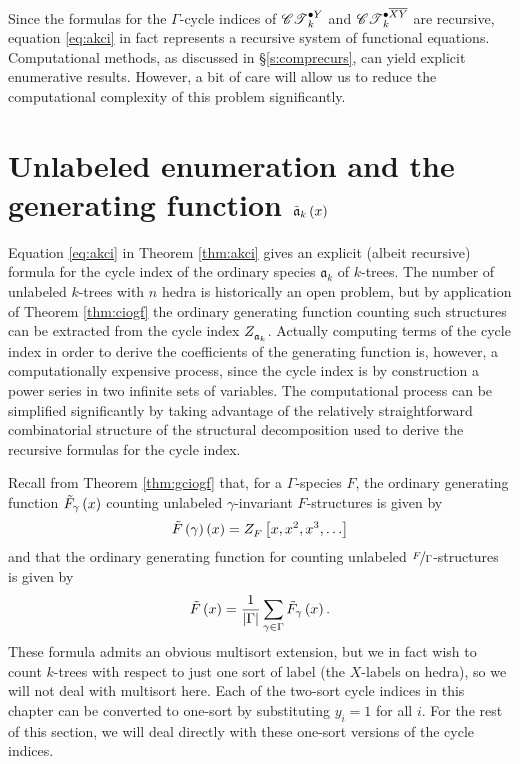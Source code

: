 \documentclass[sectionflow,singlespace,twoside,boldmathhdr,draft]{brandiss} %
\numberwithin{section}{chapter}
\numberwithin{figure}{chapter}
\begin{document}
Since the formulas for the $\Gamma$-cycle indices of $\pointed[Y]{\specname{CT}}_{k}$ and $\pointed[\overline{XY}]{\specname{CT}}_{k}$ are recursive, equation \eqref{eq:akci} in fact represents a recursive system of functional equations.
Computational methods, as discussed in \S \ref{s:comprecurs}, can yield explicit enumerative results.
However, a bit of care will allow us to reduce the computational complexity of this problem significantly.

\section{Unlabeled enumeration and the generating function $\tilde{\mathfrak{a}}_{k} \pbrac{x}$}
Equation \eqref{eq:akci} in Theorem \ref{thm:akci} gives an explicit (albeit recursive) formula for the cycle index of the ordinary species $\mathfrak{a}_{k}$ of $k$-trees.
The number of unlabeled $k$-trees with $n$ hedra is historically an open problem, but by application of Theorem \ref{thm:ciogf} the ordinary generating function counting such structures can be extracted from the cycle index $\ci{\mathfrak{a}_{k}}$.
Actually computing terms of the cycle index in order to derive the coefficients of the generating function is, however, a computationally expensive process, since the cycle index is by construction a power series in two infinite sets of variables.
The computational process can be simplified significantly by taking advantage of the relatively straightforward combinatorial structure of the structural decomposition used to derive the recursive formulas for the cycle index.

Recall from Theorem \ref{thm:gciogf} that, for a $\Gamma$-species $F$, the ordinary generating function $\tilde{F}_{\gamma} \pbrac{x}$ counting unlabeled $\gamma$-invariant $F$-structures is given by
\[\tilde{F} \pbrac{\gamma} \pbrac{x} = \ci{F} \sbrac{x, x^2, x^3, \dots}\]
and that the ordinary generating function for counting unlabeled $\nicefrac{F}{\Gamma}$-structures is given by
\[\tilde{F} \pbrac{x} = \frac{1}{\abs{\Gamma}} \sum_{\gamma \in \Gamma} \tilde{F}_{\gamma} \pbrac{x}.\]
These formula admits an obvious multisort extension, but we in fact wish to count $k$-trees with respect to just one sort of label (the $X$-labels on hedra), so we will not deal with multisort here.
Each of the two-sort cycle indices in this chapter can be converted to one-sort by substituting $y_{i} = 1$ for all $i$.
For the rest of this section, we will deal directly with these one-sort versions of the cycle indices.
\end{document}
